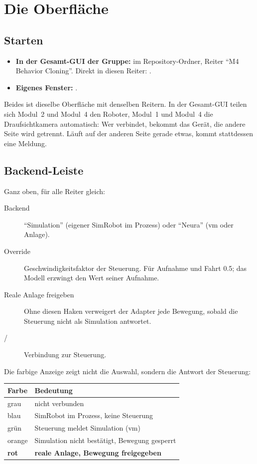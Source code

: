 \chapter{Die Oberfläche}
\label{ch:oberflaeche}

\section{Starten}

\begin{itemize}
  \item \textbf{In der Gesamt-GUI der Gruppe:}  im Repository-Ordner, Reiter
    \enquote{M4 Behavior Cloning}. Direkt in diesen Reiter: .
  \item \textbf{Eigenes Fenster:} .
\end{itemize}
Beides ist dieselbe Oberfläche mit denselben Reitern. In der Gesamt-GUI teilen sich Modul~2 und
Modul~4 den Roboter, Modul~1 und Modul~4 die Draufsichtkamera automatisch: Wer verbindet,
bekommt das Gerät, die andere Seite wird getrennt. Läuft auf der anderen Seite gerade etwas, kommt
stattdessen eine Meldung.

\section{Backend-Leiste}
\label{sec:backend}

Ganz oben, für alle Reiter gleich:
\begin{description}
  \item[Backend] \enquote{Simulation} (eigener SimRobot im Prozess) oder \enquote{Neura}
    (\acs{vm} oder Anlage).
  \item[Override] Geschwindigkeitsfaktor der Steuerung. Für Aufnahme und Fahrt \num{0.5}; das
    Modell erzwingt den Wert seiner Aufnahme.
  \item[Reale Anlage freigeben] Ohne diesen Haken verweigert der Adapter jede Bewegung, sobald
    die Steuerung nicht als Simulation antwortet.
  \item[ / ] Verbindung zur Steuerung.
\end{description}

Die farbige Anzeige zeigt nicht die Auswahl, sondern die Antwort der Steuerung:
\begin{center}
  \small
  \begin{tabular}{@{}l l@{}}
    \toprule
    Farbe & Bedeutung \\
    \midrule
    grau & nicht verbunden \\
    blau & SimRobot im Prozess, keine Steuerung \\
    grün & Steuerung meldet Simulation (\acs{vm}) \\
    orange & Simulation nicht bestätigt, Bewegung gesperrt \\
    \textbf{rot} & \textbf{reale Anlage, Bewegung freigegeben} \\
    \bottomrule
  \end{tabular}
\end{center}

